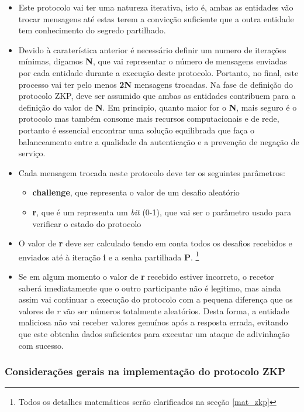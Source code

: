\begin{itemize}
    \item Este protocolo vai ter uma natureza iterativa, isto é, ambas as entidades vão trocar mensagens até estas terem a convicção suficiente que a outra entidade tem conhecimento do segredo partilhado.
    \item Devido à caraterística anterior é necessário definir um numero de iterações mínimas, digamos \textbf{N}, que vai representar o número de mensagens enviadas por cada entidade durante a execução deste protocolo. Portanto, no final, este processo vai ter pelo menos \textbf{2N} mensagens trocadas. Na fase de definição do protocolo ZKP, deve ser assumido que ambas as entidades contribuem para a definição do valor de \textbf{N}. Em principio, quanto maior for o \textbf{N}, mais seguro é o protocolo mas também consome mais recursos computacionais e de rede, portanto é essencial encontrar uma solução equilibrada que faça o balanceamento entre a qualidade da autenticação e a prevenção de negação de serviço.
    \item Cada mensagem trocada neste protocolo deve ter os seguintes parâmetros:
    \begin{itemize}
        \item \textbf{challenge}, que representa o valor de um desafio aleatório
        \item \textbf{r}, que é um representa um \textit{bit} (0-1), que vai ser o parâmetro usado para verificar o estado do protocolo
    \end{itemize}
    \item O valor de \textbf{r} deve ser calculado tendo em conta todos os desafios recebidos e enviados até à iteração \textbf{i} e a senha partilhada \textbf{P}. \footnote{Todos os detalhes matemáticos serão clarificados na secção \ref{mat_zkp}}
    \item Se em algum momento o valor de \textbf{r} recebido estiver incorreto, o recetor saberá imediatamente que o outro participante não é legitimo, mas ainda assim vai continuar a execução do protocolo com a pequena diferença que os valores de  \textit{r} vão ser números totalmente aleatórios. Desta forma, a entidade maliciosa não vai receber valores genuínos após a resposta errada, evitando que este obtenha dados suficientes para executar um ataque de adivinhação com sucesso.
\end{itemize}

\subsubsection{Considerações gerais na implementação do protocolo ZKP}

